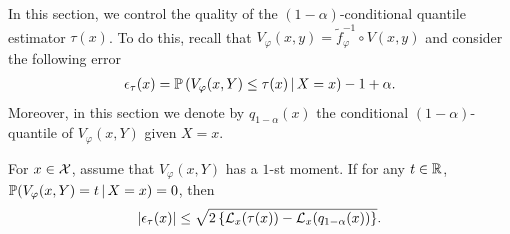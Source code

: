 

In this section, we control the quality of the $(1-\alpha)$-conditional quantile estimator $\tau(x)$.
To do this, recall that $V_\varphi(x,y)=\tilde{f}_\varphi^{-1}\circ V(x,y)$ and consider the following error
\begin{align*}
  \epsilon_{\tau}(x)
  = \mathbb{P}\left({V_\varphi(x,Y)\le \tau(x) \,\vert\, X=x}\right) - 1  + \alpha.
\end{align*}
%
Moreover, in this section we denote by $q_{1-\alpha}(x)$ the conditional $(1-\alpha)$-quantile of $V_\varphi(x,Y)$ given $X=x$.

\begin{theorem}
\label{eq:quantile-conditional-pinball-loss}
  For $x\in\mathcal{X}$, assume that $V_\varphi(x,Y)$ has a $1$-st moment.
  If for any $t\in\mathbb{R}$, $\mathbb{P}(V_\varphi(x,Y)=t\,\vert\, X=x)=0$, then
  \begin{equation*}
    \left\lvert{\epsilon_{\tau}(x)}\right\rvert
    \le \sqrt{ 2 \left\{{ \mathcal{L}_{x}(\tau(x)) - \mathcal{L}_{x}(q_{1-\alpha}(x)) }\right\} }.
  \end{equation*}
\end{theorem}

